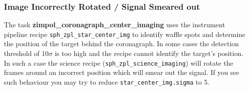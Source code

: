 \subsubsection{Image Incorrectly Rotated / Signal Smeared out}

The task \textbf{zimpol\_coronagraph\_center\_imaging} uses the instrument pipeline recipe \texttt{sph\_zpl\_star\_center\_img}
to identify waffle spots and determine the position of the target behind the coronagraph.
In some cases the detection threshold of 10$\sigma$ is too high and the recipe cannot identify
the target’s position. In such a case the science recipe (\texttt{sph\_zpl\_science\_imaging})
will rotate the frames around an incorrect position which will smear out the signal.
If you see such behaviour you may try to reduce \texttt{star\_center\_img.sigma} to 5.
